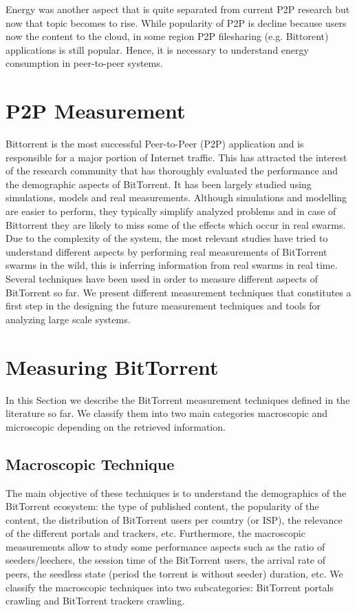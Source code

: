 Energy was another aspect that is quite separated from current P2P research but now that topic becomes to rise. 
While popularity of P2P is decline because users now the content to the cloud, in some region P2P filesharing (e.g. Bittorent) applications is still popular.
Hence, it is necessary to understand energy consumption in peer-to-peer systems.






\section{P2P Measurement}


Bittorrent is the most successful Peer-to-Peer (P2P) application and is responsible for a major portion of Internet traffic. 
This has attracted the interest of the research community that has thoroughly evaluated the performance and the demographic aspects of BitTorrent. 
It has been largely studied using simulations, models and real measurements. 
Although simulations and modelling are easier to perform, they typically simplify analyzed problems and in case of Bittorrent they are likely to miss some of the effects which occur in real swarms. 
Due to the complexity of the system, the most relevant studies have tried to understand different aspects by performing real measurements of BitTorrent swarms in the wild, this is inferring information from real swarms in real time.
Several techniques have been used in order to measure different aspects of BitTorrent so far. 
We present different measurement techniques that constitutes a first step in the designing the future measurement techniques and tools for analyzing large scale systems.

\section{Measuring BitTorrent}
In this Section we describe the BitTorrent measurement techniques defined in the literature so far. 
We classify them into two main categories macroscopic and microscopic depending on the retrieved information. 

\subsection{Macroscopic Technique}
The main objective of these techniques is to understand the demographics of the BitTorrent ecosystem: the type of published content, the popularity of the content, the distribution of BitTorrent users per country (or ISP), the relevance of the different portals and trackers, etc. 
Furthermore, the macroscopic measurements allow to study some performance aspects such as the ratio of seeders/leechers, the session time of the BitTorrent users, the arrival rate of peers, the seedless state (period the torrent is without seeder) duration, etc.
We classify the macroscopic techniques into two subcategories: BitTorrent portals crawling and BitTorrent trackers crawling.

